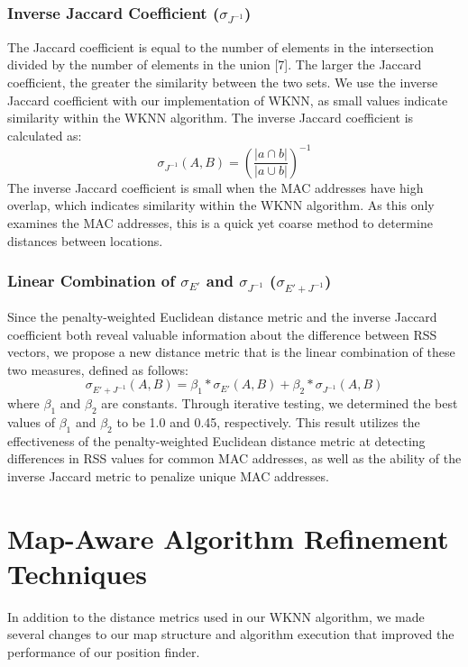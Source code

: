 \documentclass[conference]{IEEEtran}
\begin{document}
\subsubsection{Inverse Jaccard Coefficient ($\sigma_{J^{-1}}$)}
\indent The Jaccard coefficient is equal to the number of elements in the intersection divided by the number of elements in the union [7]. The larger the Jaccard coefficient, the greater the similarity between the two sets. We use the inverse Jaccard coefficient with our implementation of WKNN, as small values indicate similarity within the WKNN algorithm. The inverse Jaccard coefficient is calculated as:  
\begin{equation}
\label{jaccard}
\sigma_{J^{-1}}(A, B) = (\frac{|a\cap b|}{|a\cup b|})^{-1}
\end{equation}
The inverse Jaccard coefficient is small when the MAC addresses have high overlap, which indicates similarity within the WKNN algorithm. As this only examines the MAC addresses, this is a quick yet coarse method to determine distances between locations.

\subsubsection{Linear Combination of $\sigma_{E'}$ and $\sigma_{J^{-1}}$ ($\sigma_{E' + J^{-1}}$)}
\indent Since the penalty-weighted Euclidean distance metric and the inverse Jaccard coefficient both reveal valuable information about the difference between RSS vectors, we propose a new distance metric that is the linear combination of these two measures, defined as follows:
\begin{equation}
\label{combined}
\sigma_{E'+J^{-1}}(A, B) = \beta_1*\sigma_{E'}(A, B)+\beta_2*\sigma_{J^{-1}}(A, B)
\end{equation}
where $\beta_1$ and $\beta_2$ are constants. Through iterative testing, we determined the best values of $\beta_1$ and $\beta_2$ to be 1.0 and 0.45, respectively. This result utilizes the effectiveness of the penalty-weighted Euclidean distance metric at detecting differences in RSS values for common MAC addresses, as well as the ability of the inverse Jaccard metric to penalize unique MAC addresses.

\section{Map-Aware Algorithm Refinement Techniques}

In addition to the distance metrics used in our WKNN algorithm, we made several changes to our map structure and algorithm execution that improved the performance of our position finder. 
\end{document}
